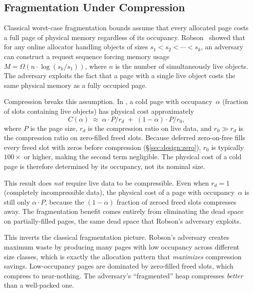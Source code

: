 \subsection{Fragmentation Under Compression}
\label{sec:design:fragmentation}

Classical worst-case fragmentation bounds assume that every allocated
page costs a full page of physical memory regardless of its
occupancy.  Robson~\cite{robson1977worst} showed that for any online
allocator handling objects of sizes $s_1 < s_2 < \cdots < s_k$, an
adversary can construct a request sequence forcing memory usage
$M = \Omega(n \cdot \log(s_k / s_1))$, where $n$ is the number of
simultaneously live objects.  The adversary exploits the fact that a
page with a single live object costs the same physical memory as a
fully occupied page.

Compression breaks this assumption.  In \sys, a cold page with
occupancy~$\alpha$ (fraction of slots containing live objects) has
physical cost approximately
\[
  C(\alpha) \;\approx\; \alpha \cdot P / r_d \;+\; (1-\alpha) \cdot P / r_0,
\]
where $P$ is the page size, $r_d$ is the compression ratio on live
data, and $r_0 \gg r_d$ is the compression ratio on zero-filled freed
slots.  Because deferred zero-on-free fills every freed slot with
zeros before compression (\S\ref{sec:design:zero}), $r_0$ is
typically $100\times$ or higher, making the second term negligible.
The physical cost of a cold page is therefore determined by its
occupancy, not its nominal size.

This result does \emph{not} require live data to be compressible.
Even when $r_d = 1$ (completely incompressible data), the physical
cost of a page with occupancy~$\alpha$ is still only
$\alpha \cdot P$, because the $(1-\alpha)$ fraction of zeroed freed
slots compresses away.  The fragmentation benefit comes entirely
from eliminating the dead space on partially-filled pages, the
same dead space that Robson's adversary exploits.

This inverts the classical fragmentation picture.  Robson's
adversary creates maximum waste by producing many pages with low
occupancy across different size classes, which is exactly the
allocation pattern that \emph{maximizes} compression savings.  Low-occupancy pages are
dominated by zero-filled freed slots, which compress to near-nothing.
The adversary's ``fragmented'' heap compresses \emph{better} than a
well-packed one.

